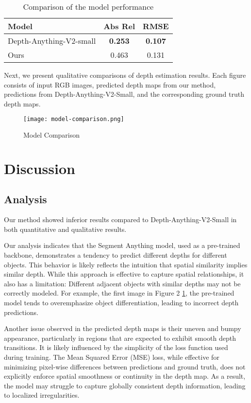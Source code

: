 \documentclass{article}
\begin{document}
\begin{table}[ht]
\centering
\caption{Comparison of the model performance}
\label{tab:quantitative-results}
\begin{tabular}{|l|c|c|}
\hline
\textbf{Model}                 & \textbf{Abs Rel} & \textbf{RMSE} \\ \hline
Depth-Anything-V2-small        & \textbf{0.253}                      & \textbf{0.107}                         \\ \hline
Ours                  & 0.463             & 0.131                \\ \hline
\end{tabular}
\end{table}

Next, we present qualitative comparisons of depth estimation results. Each figure consists of input RGB images, predicted depth maps from our method, predictions from Depth-Anything-V2-Small, and the corresponding ground truth depth maps.

\begin{figure}[ht]
\centering
\texttt{[image: model-comparison.png]}
\caption{Model Comparison}
\label{fig:model-comparison}
\end{figure}

\section{Discussion}

\subsection{Analysis}

Our method showed inferior results compared to Depth-Anything-V2-Small in both quantitative and qualitative results. 

Our analysis indicates that the Segment Anything model, used as a pre-trained backbone, demonstrates a tendency to predict different depths for different objects. This behavior is likely reflects the intuition that spatial similarity implies similar depth. While this approach is effective to capture spatial relationships, it also has a limitation: Different adjacent objects with similar depths may not be correctly modeled. For example, the first image in Figure 2 \ref{fig:model-comparison}, the pre-trained model tends to overemphasize object differentiation, leading to incorrect depth predictions.

Another issue observed in the predicted depth maps is their uneven and bumpy appearance, particularly in regions that are expected to exhibit smooth depth transitions. It is likely influenced by the simplicity of the loss function used during training. The Mean Squared Error (MSE) loss, while effective for minimizing pixel-wise differences between predictions and ground truth, does not explicitly enforce spatial smoothness or continuity in the depth map. As a result, the model may struggle to capture globally consistent depth information, leading to localized irregularities.
\end{document}

